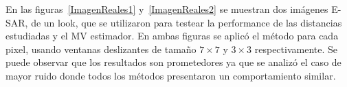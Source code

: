 En las figuras~\ref{ImagenReales1} y~\ref{ImagenReales2} se muestran dos imágenes E-SAR, de un look, que se utilizaron para testear la performance de las distancias estudiadas y el MV estimador. En ambas figuras se aplicó el método para cada pixel, usando ventanas deslizantes de tamaño $7 \times 7$ y $3 \times 3$ respectivamente. Se puede observar que los resultados son prometedores ya que se analizó el caso de mayor ruido donde todos los métodos presentaron un comportamiento similar.


\begin{figure}[htb]
	\begin{minipage}[b]{0.45\linewidth} %
		\centering
		\\

\end{minipage}
\end{figure}
